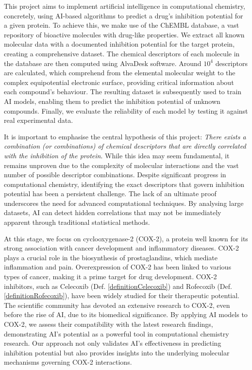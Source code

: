 \documentclass[12pt,letterpaper]{article}
\begin{document}
\begin{multicols}{2}
This project aims to implement artificial intelligence in computational chemistry, concretely, using AI-based algorithms to predict a drug’s inhibition potential\cite{BookIC50} for a given protein. To achieve this, we make use of the ChEMBL database\cite{ChemblDatabase}, a vast repository of bioactive molecules with drug-like properties. We extract all known molecular data with a documented inhibition potential for the target protein, creating a comprehensive dataset. The chemical descriptors of each molecule in the database are then computed using AlvaDesk\cite{MauriMolecularDescriptorsBook}\cite{AlvaDescSecondPaper} software. Around $10^4$ descriptors are calculated\cite{DescriptorsBookClassification}, which comprehend from the elemental molecular weight to the complex equipotential electronic surface, providing critical information about each compound’s behaviour. The resulting dataset is subsequently used to train AI models, enabling them to predict the inhibition potential of unknown compounds. Finally, we evaluate the reliability of each model by testing it against real experimental data. \par

It is important to emphasise the central hypothesis of this project: \emph{There exists a combination (or combinations) of chemical descriptors that are directly correlated with the inhibition of the protein}. While this idea may seem fundamental, it remains unproven due to the complexity of molecular interactions and the vast number of possible descriptor combinations. Despite significant progress in computational chemistry, identifying the exact descriptors that govern inhibition potential has been a persistent challenge. The lack of an ultimate proof underscores the need for advanced computational techniques. By analysing large datasets, AI can detect hidden correlations that may not be immediately apparent through traditional statistical methods.\par

At this stage, we focus on cyclooxygenase-2 (COX-2), a protein well known for its strong association with cancer development and inflammatory diseases\cite{DefinitionCOX2CancerDictionary}. COX-2 plays a crucial role in the biosynthesis of prostaglandins, which mediate inflammation and pain. Overexpression of COX-2 has been linked to various types of cancer, making it a prime target for drug development. COX-2 inhibitors, such as Celecoxib (Def. \ref{definitionCelecoxib}) and Rofecoxib (Def. \ref{definitionRofecoxib}), have been widely studied for their therapeutic potential. The scientific community has devoted an extensive research to COX-2, even before the rise of AI, due to its biomedical significance\cite{Cox2InhibitorsReview}. By applying AI models to COX-2, we assess their compatibility with the latest research findings, demonstrating AI’s potential as a powerful tool in computational chemistry research. Our approach not only validates AI’s effectiveness in predicting inhibition potential but also provides insights into the underlying molecular mechanisms governing COX-2 interactions.\par


\end{multicols}
\end{document}
